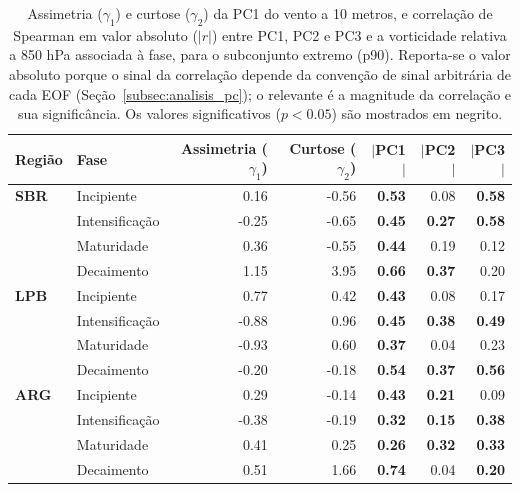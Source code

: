 \begin{table}[htbp]
\centering
\caption[Momentos estatísticos e correlação de PC1--PC3 do vento a 10 m - Subconjunto p90]
{Assimetria ($\gamma_1$) e curtose ($\gamma_2$) da PC1 do vento a 10 metros, e correlação de Spearman em valor absoluto ($|r|$) entre PC1, PC2 e PC3 e a vorticidade relativa a 850 hPa associada à fase, para o subconjunto extremo (p90). Reporta-se o valor absoluto porque o sinal da correlação depende da convenção de sinal arbitrária de cada EOF (Seção~\ref{subsec:analisis_pc}); o relevante é a magnitude da correlação e sua significância. Os valores significativos ($p<0.05$) são mostrados em negrito.}
\label{tab:stat_p90_w10}
\begin{tabular*}{\textwidth}{@{\extracolsep{\fill}}llrrrrr}
\hline
\textbf{Região} & \textbf{Fase} & \textbf{Assimetria ($\gamma_1$)} & \textbf{Curtose ($\gamma_2$)} & \textbf{$|$PC1$|$} & \textbf{$|$PC2$|$} & \textbf{$|$PC3$|$} \\
\hline
\textbf{SBR} & Incipiente       & 0.16  & -0.56 & \textbf{0.53} & 0.08 & \textbf{0.58} \\
             & Intensificação & -0.25 & -0.65 & \textbf{0.45} & \textbf{0.27} & \textbf{0.58} \\
             & Maturidade         & 0.36  & -0.55 & \textbf{0.44} & 0.19 & 0.12 \\
             & Decaimento     & 1.15  & 3.95  & \textbf{0.66} & \textbf{0.37} & 0.20 \\
\hline
\textbf{LPB} & Incipiente       & 0.77  & 0.42  & \textbf{0.43} & 0.08 & 0.17 \\
             & Intensificação & -0.88 & 0.96  & \textbf{0.45} & \textbf{0.38} & \textbf{0.49} \\
             & Maturidade         & -0.93 & 0.60  & \textbf{0.37} & 0.04 & 0.23 \\
             & Decaimento     & -0.20 & -0.18 & \textbf{0.54} & \textbf{0.37} & \textbf{0.56} \\
\hline
\textbf{ARG} & Incipiente       & 0.29  & -0.14 & \textbf{0.43} & \textbf{0.21} & 0.09 \\
             & Intensificação & -0.38 & -0.19 & \textbf{0.32} & \textbf{0.15} & \textbf{0.38} \\
             & Maturidade         & 0.41  & 0.25  & \textbf{0.26} & \textbf{0.32} & \textbf{0.33} \\
             & Decaimento     & 0.51  & 1.66  & \textbf{0.74} & 0.04 & \textbf{0.20} \\
\hline
\end{tabular*}
\end{table}
